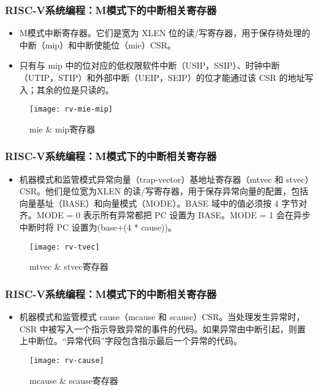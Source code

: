 
\begin{frame}
    \frametitle{RISC-V系统编程：M模式下的中断相关寄存器}
    \begin{itemize}
        \item M模式中断寄存器。它们是宽为 XLEN 位的读/写寄存器，用于保存待处理的中断（mip）和中断使能位（mie）CSR。
        \item 只有与 mip 中的位对应的低权限软件中断（USIP，SSIP）、时钟中断（UTIP，STIP）和外部中断（UEIP，SEIP）的位才能通过该 CSR 的地址写入；其余的位是只读的。
    \end{itemize}   
    \begin{figure}
        \centering
        \texttt{[image: rv-mie-mip]}
        \caption{mie \&  mip寄存器}
    \end{figure}
\end{frame}


\begin{frame}
    \frametitle{RISC-V系统编程：M模式下的中断相关寄存器}
    \begin{itemize}
        \item 机器模式和监管模式异常向量（trap-vector）基地址寄存器（mtvec 和 stvec）CSR。他们是位宽为XLEN 的读/写寄存器，用于保存异常向量的配置，包括向量基址（BASE）和向量模式（MODE）。BASE 域中的值必须按 4 字节对齐。MODE = 0 表示所有异常都把 PC 设置为 BASE。MODE = 1 会在异步中断时将 PC 设置为(base+(4 * cause))。
    \end{itemize}   
    \begin{figure}
        \centering
        \texttt{[image: rv-tvec]}
        \caption{mtvec  \& stvec寄存器}
    \end{figure}
\end{frame}


\begin{frame}
    \frametitle{RISC-V系统编程：M模式下的中断相关寄存器}
    \begin{itemize}
        \item 机器模式和监管模式 cause（mcause 和 scause）CSR。当处理发生异常时，CSR 中被写入一个指示导致异常的事件的代码。如果异常由中断引起，则置上中断位。“异常代码”字段包含指示最后一个异常的代码。
    \end{itemize}   
    \begin{figure}
        \centering
        \texttt{[image: rv-cause]}
        \caption{mcause  \& scause寄存器}
    \end{figure}
\end{frame}

